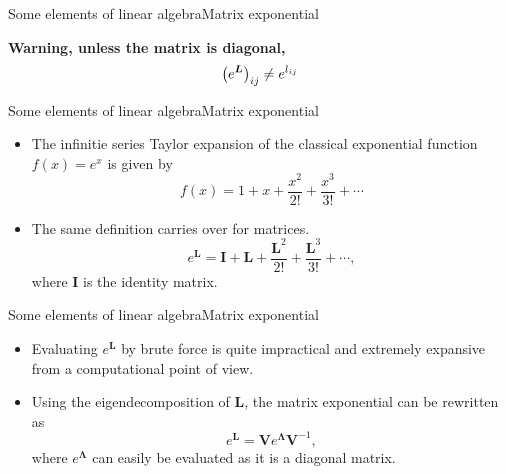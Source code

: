 \documentclass[usenames,dvipsnames,svgnames,10pt,aspectratio=169]{beamer}
\begin{document}
\begin{frame}[t, c]{Some elements of linear algebra}{Matrix exponential}

	\begin{block}{\centering \textbf{Warning, unless the matrix is diagonal,}}
		\begin{equation}
			\left( e^{\bm L} \right)_{ij} \neq e^{l_{ij}}
			\notag
		\end{equation}
	\end{block}

	\vspace{1cm}
\end{frame}

\begin{frame}[t, c]{Some elements of linear algebra}{Matrix exponential}
	\begin{itemize}
		\item The infinitie series Taylor expansion of the classical exponential function $f(x) = e^x$ is given by
		$$f(x) = 1 + x + \displaystyle \frac{x^2}{2!} + \frac{x^3}{3!} + \cdots$$

		\bigskip

		\item The same definition carries over for matrices.
		$$e^{\bm L} = {\bm I} + {\bm L} + \displaystyle  \frac{{\bm L}^2}{2!} + \frac{{\bm L}^3}{3!} + \cdots,$$
		where ${\bm I}$ is the identity matrix.
	\end{itemize}

	\vspace{1cm}
\end{frame}

\begin{frame}[t, c]{Some elements of linear algebra}{Matrix exponential}
	\begin{itemize}
		\item Evaluating $e^{\bm L}$ by brute force is quite impractical and extremely expansive from a computational point of view.

		\bigskip

		\item Using the eigendecomposition of ${\bm L}$, the matrix exponential can be rewritten as
		$$e^{\bm L} = {\bm V} e^{\boldsymbol \Lambda} {\bm V}^{-1},$$
		where $e^{\boldsymbol \Lambda}$ can easily be evaluated as it is a diagonal matrix.
	\end{itemize}

	\vspace{1cm}
\end{frame}
\end{document}
